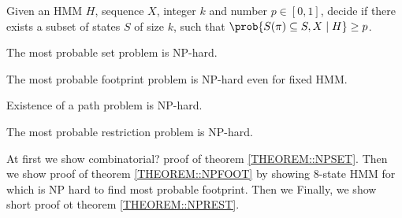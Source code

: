 \begin{definition}
Given an HMM $H$, sequence $X$, integer $k$ and number $p\in[0,1]$, decide if
there exists a subset of states $S$ of size $k$, such that
$\prob{S(\pi)\subseteq S, X\mid H} \geq p$.
\end{definition}

\begin{theorem}
The most probable set problem is NP-hard. \label{THEOREM::NPSET}
\end{theorem}

\begin{theorem}
The most probable footprint problem is NP-hard even for fixed HMM.
\label{THEOREM::NPFOOT}
\end{theorem}

\begin{theorem}
Existence of a path problem is NP-hard. \label{THEOREM::NPEXIST}
\end{theorem}

\begin{theorem}
The most probable restriction problem is NP-hard. \label{THEOREM::NPREST}
\end{theorem}

At first we show combinatorial? proof of theorem \ref{THEOREM::NPSET}. Then we
show proof of theorem \ref{THEOREM::NPFOOT} by showing $8$-state HMM for 
which is NP hard to find most probable footprint. Then we 
Finally, we show short proof ot theorem \ref{THEOREM::NPREST}.


